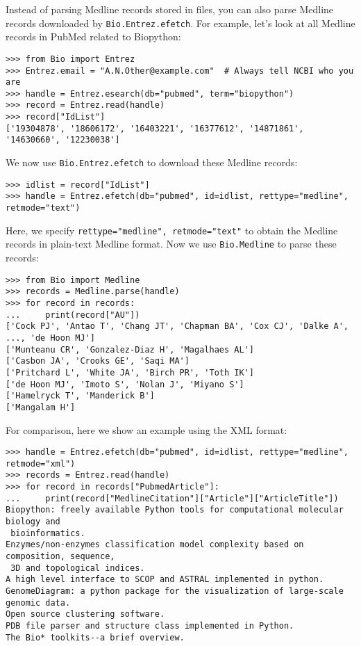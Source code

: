 Instead of parsing Medline records stored in files, you can also parse Medline records downloaded by \verb+Bio.Entrez.efetch+. For example, let's look at all Medline records in PubMed related to Biopython:
\begin{verbatim}
>>> from Bio import Entrez
>>> Entrez.email = "A.N.Other@example.com"  # Always tell NCBI who you are
>>> handle = Entrez.esearch(db="pubmed", term="biopython")
>>> record = Entrez.read(handle)
>>> record["IdList"]
['19304878', '18606172', '16403221', '16377612', '14871861', '14630660', '12230038']
\end{verbatim}
We now use \verb+Bio.Entrez.efetch+ to download these Medline records:
\begin{verbatim}
>>> idlist = record["IdList"]
>>> handle = Entrez.efetch(db="pubmed", id=idlist, rettype="medline", retmode="text")
\end{verbatim}
Here, we specify \verb+rettype="medline", retmode="text"+ to obtain the Medline records in plain-text Medline format. Now we use \verb+Bio.Medline+ to parse these records:
\begin{verbatim}
>>> from Bio import Medline
>>> records = Medline.parse(handle)
>>> for record in records:
...     print(record["AU"])
['Cock PJ', 'Antao T', 'Chang JT', 'Chapman BA', 'Cox CJ', 'Dalke A', ..., 'de Hoon MJ']
['Munteanu CR', 'Gonzalez-Diaz H', 'Magalhaes AL']
['Casbon JA', 'Crooks GE', 'Saqi MA']
['Pritchard L', 'White JA', 'Birch PR', 'Toth IK']
['de Hoon MJ', 'Imoto S', 'Nolan J', 'Miyano S']
['Hamelryck T', 'Manderick B']
['Mangalam H']
\end{verbatim}

For comparison, here we show an example using the XML format:
\begin{verbatim}
>>> handle = Entrez.efetch(db="pubmed", id=idlist, rettype="medline", retmode="xml")
>>> records = Entrez.read(handle)
>>> for record in records["PubmedArticle"]:
...     print(record["MedlineCitation"]["Article"]["ArticleTitle"])
Biopython: freely available Python tools for computational molecular biology and
 bioinformatics.
Enzymes/non-enzymes classification model complexity based on composition, sequence,
 3D and topological indices.
A high level interface to SCOP and ASTRAL implemented in python.
GenomeDiagram: a python package for the visualization of large-scale genomic data.
Open source clustering software.
PDB file parser and structure class implemented in Python.
The Bio* toolkits--a brief overview.
\end{verbatim}


